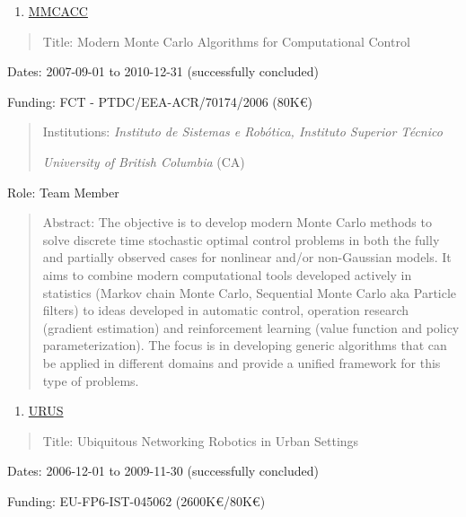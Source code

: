 \begin{enumerate}
\def\labelenumi{\arabic{enumi}.}
\setcounter{enumi}{11}
\item
  \ul{MMCACC}
\end{enumerate}

\begin{quote}
Title: Modern Monte Carlo Algorithms for Computational Control
\end{quote}

Dates: 2007-09-01 to 2010-12-31 (successfully concluded)

Funding: FCT - PTDC/EEA-ACR/70174/2006 (80K€)

\begin{quote}
Institutions: \emph{Instituto de Sistemas e Robótica, Instituto Superior
Técnico}

\emph{University of British Columbia} (CA)
\end{quote}

Role: Team Member

\begin{quote}
Abstract: The objective is to develop modern Monte Carlo methods to
solve discrete time stochastic optimal control problems in both the
fully and partially observed cases for nonlinear and/or non-Gaussian
models. It aims to combine modern computational tools developed actively
in statistics (Markov chain Monte Carlo, Sequential Monte Carlo aka
Particle filters) to ideas developed in automatic control, operation
research (gradient estimation) and reinforcement learning (value
function and policy parameterization). The focus is in developing
generic algorithms that can be applied in different domains and provide
a unified framework for this type of problems.
\end{quote}

\begin{enumerate}
\def\labelenumi{\arabic{enumi}.}
\setcounter{enumi}{12}
\item
  \ul{URUS}
\end{enumerate}

\begin{quote}
Title: Ubiquitous Networking Robotics in Urban Settings
\end{quote}

Dates: 2006-12-01 to 2009-11-30 (successfully concluded)

Funding: EU-FP6-IST-045062 (2600K€/80K€)

